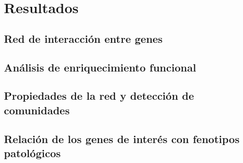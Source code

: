 \section{Resultados}

\subsection{Red de interacción entre genes}

\subsection{Análisis de enriquecimiento funcional}

\subsection{Propiedades de la red y detección de comunidades}

\subsection{Relación de los genes de interés con fenotipos patológicos}